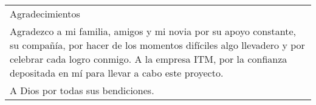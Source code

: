 
\newpage

%
%

\begin{flushright}
    \begin{itshape}
        \vspace*{\fill}
        
        \begin{tabular}{| J{5cm}}
            \hspace{\fill} Agradecimientos\\
            \newline
            Agradezco a mi familia, amigos y mi novia por su apoyo constante, su compañía, por hacer de los momentos difíciles algo llevadero y por celebrar cada logro conmigo. A la empresa ITM, por la confianza depositada en mí para llevar a cabo este proyecto. \\A Dios por todas sus bendiciones.
        \end{tabular}
        
        \vspace{\fill}
    \end{itshape}
\end{flushright}